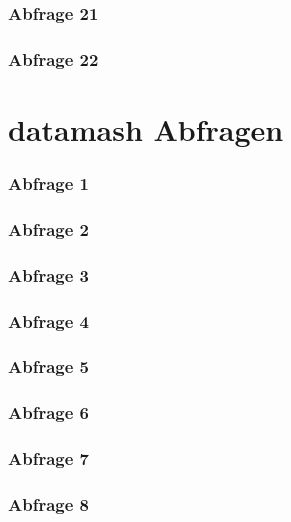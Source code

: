 \subsection*{Abfrage 21}

\subsection*{Abfrage 22}


\chapter{datamash Abfragen}
\subsection*{Abfrage 1}

\subsection*{Abfrage 2}

\subsection*{Abfrage 3}

\subsection*{Abfrage 4}

\subsection*{Abfrage 5}

\subsection*{Abfrage 6}

\subsection*{Abfrage 7}

\subsection*{Abfrage 8}


